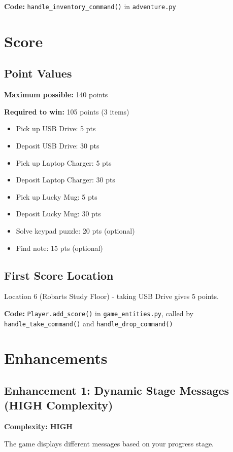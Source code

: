 \documentclass[12pt]{article}
\begin{document}
\textbf{Code:} \texttt{handle\_inventory\_command()} in \texttt{adventure.py}

\section{Score}

\subsection{Point Values}

\textbf{Maximum possible:} 140 points

\textbf{Required to win:} 105 points (3 items)

\begin{itemize}
\item Pick up USB Drive: 5 pts
\item Deposit USB Drive: 30 pts
\item Pick up Laptop Charger: 5 pts
\item Deposit Laptop Charger: 30 pts
\item Pick up Lucky Mug: 5 pts
\item Deposit Lucky Mug: 30 pts
\item Solve keypad puzzle: 20 pts (optional)
\item Find note: 15 pts (optional)
\end{itemize}

\subsection{First Score Location}

Location 6 (Robarts Study Floor) - taking USB Drive gives 5 points.

\textbf{Code:} \texttt{Player.add\_score()} in \texttt{game\_entities.py}, called by \texttt{handle\_take\_command()} and \texttt{handle\_drop\_command()}

\section{Enhancements}

\subsection{Enhancement 1: Dynamic Stage Messages (HIGH Complexity)}

\textbf{Complexity: HIGH}

The game displays different messages based on your progress stage.
\end{document}
